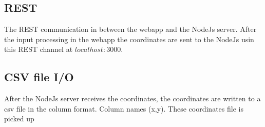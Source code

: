 \subsection*{REST}
The REST communication in between the webapp and the NodeJs server. After the input processing in the webapp the coordinates are sent to 
the NodeJs usin this REST channel at $localhost:3000$.  
\subsection*{CSV file I/O}
After the NodeJs server receives the coordinates, the coordinates are written to a csv file in the column format. 
Column names (x,y). These coordinates file is picked up 

